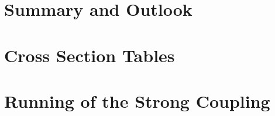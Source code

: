 \documentclass[12pt,a4paper,reqno,twoside,final]{scrbook}%
\numberwithin{equation}{subsection}
\begin{document}
\newpage
\chapter*{Summary and Outlook}
\label{ch:summary}



%



\appendix

 \chapter{Cross Section Tables}
 \label{app:cstables}
\vspace{-40pt}
 
\vspace{-15pt}

\vspace{-15pt}

\clearpage
 
 
\clearpage
\chapter{Running of the Strong Coupling}
 \label{app:asrunningtable}
 
\end{document}
